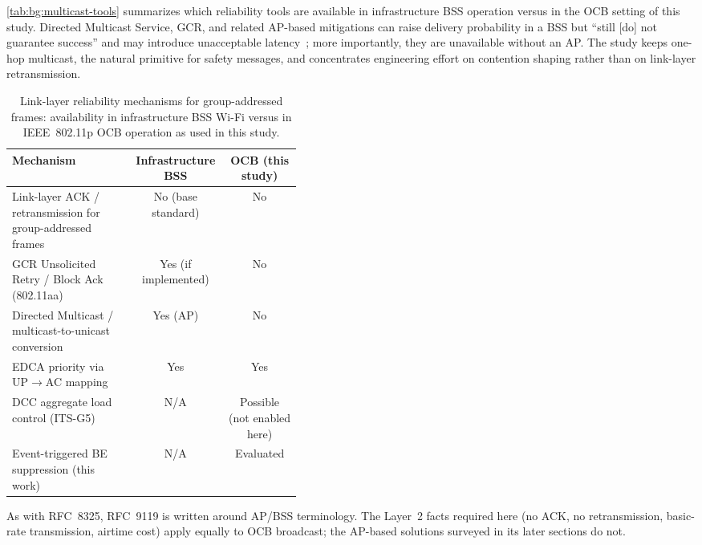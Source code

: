 \autoref{tab:bg:multicast-tools} summarizes which reliability tools are available in infrastructure BSS operation versus in the OCB setting of this study.
Directed Multicast Service, GCR, and related AP-based mitigations can raise delivery probability in a BSS but ``still [do] not guarantee success'' and may introduce unacceptable latency~\cite{RFC9119_Multicast_IEEE802_Wireless,kosekszott2012What}; more importantly, they are unavailable without an AP.
The study keeps one-hop multicast, the natural primitive for safety messages, and concentrates engineering effort on contention shaping rather than on link-layer retransmission.

\begin{table}[htb]
	\ABNTEXfontereduzida
	\caption{\label{tab:bg:multicast-tools}Link-layer reliability mechanisms for group-addressed frames: availability in infrastructure BSS Wi-Fi versus in IEEE~802.11p OCB operation as used in this study.}
	\begin{center}
		\begin{tabular}{@{}p{0.42\linewidth}cc@{}}
		    \toprule
		    Mechanism & Infrastructure BSS & OCB (this study) \\
		    \midrule
		    Link-layer ACK / retransmission for group-addressed frames & No (base standard) & No \\
		    GCR Unsolicited Retry / Block Ack (802.11aa) & Yes (if implemented) & No \\
		    Directed Multicast / multicast-to-unicast conversion & Yes (AP) & No \\
		    EDCA priority via UP$\rightarrow$AC mapping & Yes & Yes \\
		    DCC aggregate load control (ITS-G5) & N/A & Possible (not enabled here) \\
		    Event-triggered BE suppression (this work) & N/A & Evaluated \\
		    \bottomrule
		  \end{tabular}
	\end{center}
\end{table}

As with RFC~8325, RFC~9119 is written around AP/BSS terminology.
The Layer~2 facts required here (no ACK, no retransmission, basic-rate transmission, airtime cost) apply equally to OCB broadcast; the AP-based solutions surveyed in its later sections do not.

